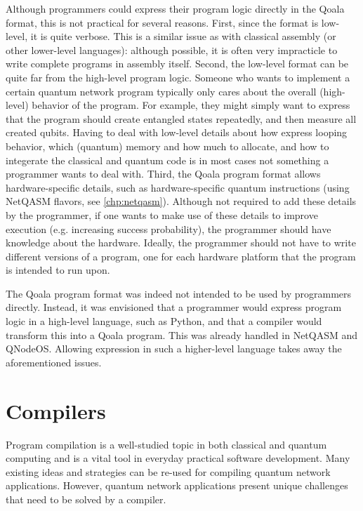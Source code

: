 Although programmers could express their program logic directly in the Qoala format, this is not practical for several reasons.
First, since the format is low-level, it is quite verbose.
This is a similar issue as with classical assembly (or other lower-level languages): although possible, it is often very impracticle to write complete programs in assembly itself.
Second, the low-level format can be quite far from the high-level program logic.
Someone who wants to implement a certain quantum network program typically only cares about the overall (high-level) behavior of the program.
For example, they might simply want to express that the program should create entangled states repeatedly, and then measure all created qubits.
Having to deal with low-level details about how express looping behavior, which (quantum) memory and how much to allocate, and how to integerate the classical and quantum code
is in most cases not something a programmer wants to deal with. 
Third, the Qoala program format allows hardware-specific details, such as hardware-specific quantum instructions (using NetQASM flavors, see \cref{chp:netqasm}).
Although not required to add these details by the programmer, if one wants to make use of these details to improve execution (e.g. increasing success probability), the programmer should have knowledge about the hardware.
Ideally, the programmer should not have to write different versions of a program, one for each hardware platform that the program is intended to run upon.

The Qoala program format was indeed not intended to be used by programmers directly.
Instead, it was envisioned that a programmer would express program logic in a high-level language, such as Python, and that a compiler would transform this into a Qoala program.
This was already handled in NetQASM and QNodeOS.
Allowing expression in such a higher-level language takes away the aforementioned issues.

\section{Compilers}

Program compilation is a well-studied topic in both classical and quantum computing and is a vital tool in everyday practical software development.
Many existing ideas and strategies can be re-used for compiling quantum network applications.
However, quantum network applications present unique challenges that need to be solved by a compiler.

